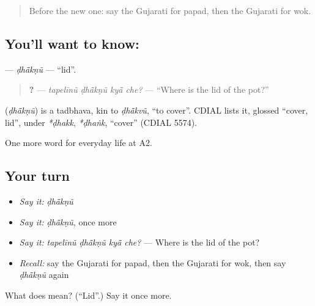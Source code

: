 \label{lesson:GU-C169-dhaknu}



\begin{quote}
Before the new one: say the Gujarati for papad, then the Gujarati for wok.
\end{quote}

\subsection*{You'll want to know: }
\textbf{} — \emph{ḍhā̃kṇũ} — \textquotedblleft{}lid\textquotedblright{}.

\begin{quote}
\textbf{   ?} — \emph{tapelīnũ ḍhā̃kṇũ kyā̃ che?} — \textquotedblleft{}Where is the lid of the pot?\textquotedblright{}
\end{quote}

\begin{cousinweb}
\textbf{} (\emph{ḍhā̃kṇũ}) is a tadbhava, kin to \emph{ḍhā̃kvũ}, \textquotedblleft{}to cover\textquotedblright{}. CDIAL lists it, glossed \textquotedblleft{}cover, lid\textquotedblright{}, under \emph{*ḍhakk}, \emph{*ḍhaṅk}, \textquotedblleft{}cover\textquotedblright{} (CDIAL 5574).
\end{cousinweb}

\begin{grammarlens}[title={What you've built}]
One more word for everyday life at A2.
\end{grammarlens}

\subsection*{Your turn}
\begin{itemize}
\raggedright
  \item \emph{Say it:} \emph{ḍhā̃kṇũ}
  \item \emph{Say it:} \emph{ḍhā̃kṇũ}, once more
  \item \emph{Say it:} \emph{tapelīnũ ḍhā̃kṇũ kyā̃ che?} — Where is the lid of the pot?
  \item \emph{Recall:} say the Gujarati for papad, then the Gujarati for wok, then say \emph{ḍhā̃kṇũ} again
\end{itemize}

\begin{tcolorbox}[breakable,colback=teal!4,colframe=teal!35!black,title={Before you move on}]
What does  mean? (\textquotedblleft{}Lid\textquotedblright{}.) Say it once more.
\end{tcolorbox}
